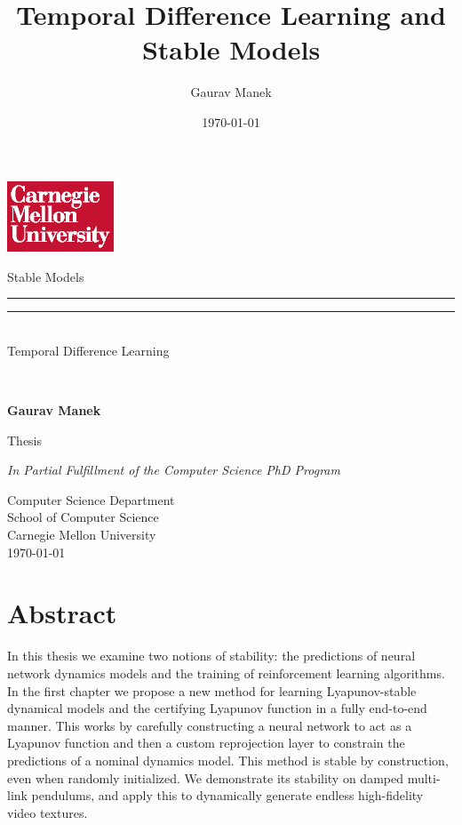 \documentclass[11pt]{book}
\title{ Temporal Difference Learning and Stable Models }
\author{ Gaurav Manek }
\date{\today}
\begin{document}
\frontmatter

\begin{titlepage}
  {
    \hfill\includegraphics[width=1.25in,trim=0 0 .125in .25in]{cmu/cmu-wordmark-square-w-on-r}
  }
  \begin{center}{%
    \vfill

    {\Huge%
    {
    {Stable Models}\\[-1.em]
    \rule{0.25\textwidth}{1pt}
    \rule{0.25\textwidth}{1pt}\\[.5em]
    {Temporal Difference Learning}
    }
    }\\


    \vspace{0.25in}

    \textbf{\large Gaurav Manek}\\

    \vfill

    Thesis

    \textit{In Partial Fulfillment of the Computer Science PhD Program}

    \vspace{0.33in}
    Computer Science Department\\
    School of Computer Science\\
    Carnegie Mellon University\\
    \today

    }\end{center}
\end{titlepage}

\cleardoublepage

\chapter{Abstract}
In this thesis we examine two notions of stability: the predictions of neural network dynamics models and the training of reinforcement learning algorithms.
In the first chapter we propose a new method for learning Lyapunov-stable dynamical models and the certifying Lyapunov function in a fully end-to-end manner. This works by carefully constructing a neural network to act as a Lyapunov function and then a custom reprojection layer to constrain the predictions of a nominal dynamics model. This method is stable by construction, even when randomly initialized. We demonstrate its stability on damped multi-link pendulums, and apply this to dynamically generate endless high-fidelity video textures.
\end{document}
